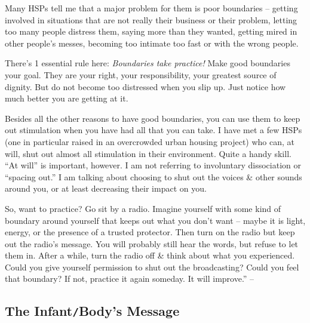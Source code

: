 \documentclass{article}
\numberwithin{equation}{section}
\begin{document}
Many HSPs tell me that a major problem for them is poor boundaries -- getting involved in situations that are not really their business or their problem, letting too many people distress them, saying more than they wanted, getting mired in other people's messes, becoming too intimate too fast or with the wrong people.

There's 1 essential rule here: \textit{Boundaries take practice!} Make good boundaries your goal. They are your right, your responsibility, your greatest source of dignity. But do not become too distressed when you slip up. Just notice how much better you are getting at it.

Besides all the other reasons to have good boundaries, you can use them to keep out stimulation when you have had all that you can take. I have met a few HSPs (one in particular raised in an overcrowded urban housing project) who can, at will, shut out almost all stimulation in their environment. Quite a handy skill. ``At will'' is important, however. I am not referring to involuntary dissociation or ``spacing out.'' I am talking about choosing to shut out the voices \& other sounds around you, or at least decreasing their impact on you.

So, want to practice? Go sit by a radio. Imagine yourself with some kind of boundary around yourself that keeps out what you don't want -- maybe it is light, energy, or the presence of a trusted protector. Then turn on the radio but keep out the radio's message. You will probably still hear the words, but refuse to let them in. After a while, turn the radio off \& think about what you experienced. Could you give yourself permission to shut out the broadcasting? Could you feel that boundary? If not, practice it again someday. It will improve.'' -- \cite[pp. 94--95]{Aron2013}

\subsection{The Infant{\tt/}Body's Message}
\end{document}

